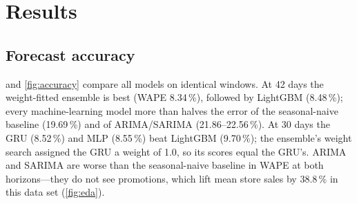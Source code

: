 \documentclass[conference]{IEEEtran}
\begin{document}
\section{Results}\label{sec:results}

\subsection{Forecast accuracy}\label{sec:results-accuracy}
 and \cref{fig:accuracy} compare all models on identical windows. At 42 days the
weight-fitted ensemble is best (WAPE 8.34\,\%), followed by LightGBM (8.48\,\%); every
machine-learning model more than halves the error of the seasonal-naive baseline (19.69\,\%) and of
ARIMA/SARIMA (21.86--22.56\,\%). At 30 days the GRU (8.52\,\%) and MLP (8.55\,\%) beat LightGBM
(9.70\,\%); the ensemble's weight search assigned the GRU a weight of 1.0, so its scores equal the
GRU's. ARIMA and SARIMA are worse than the seasonal-naive baseline in WAPE at both horizons---they
do not see promotions, which lift mean store sales by 38.8\,\% in this data set (\cref{fig:eda}).
\end{document}
